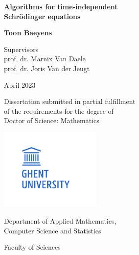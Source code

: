 
\begin{titlepage}
    \begin{center}
        \vspace*{1cm}

        \textbf{ Algorithms for time-independent\\Schrödinger equations}


        \vspace{5mm}

        \textbf{Toon Baeyens}

    \end{center}

    \vspace{1cm}

    \begin{flushleft}
        Supervisors \\
        prof. dr. Marnix Van Daele\\
        prof. dr. Joris Van der Jeugt
    \end{flushleft}

    \vfill

    \begin{center}
        April 2023

        \vspace{5mm}

        Dissertation submitted in partial fulfillment\\
        of the requirements for the degree of \\
        Doctor of Science: Mathematics
    \end{center}

    \vspace{1cm}

    \begin{minipage}{5cm}
        \hspace{-1cm}\includegraphics[width=5cm]{img/logo_ugent.pdf}
    \end{minipage}%
    \hfill%
    \begin{minipage}{6cm}
        \begin{flushright}
            Department of Applied Mathematics, \\
            Computer Science and Statistics

            \vspace{3mm}

            {Faculty of Sciences}
        \end{flushright}
    \end{minipage}

\end{titlepage}
